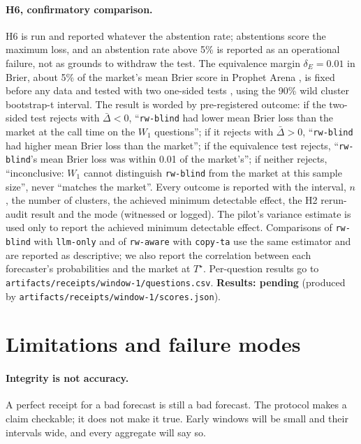 \documentclass[11pt]{article}
\newcommand{\Ts}{T^{\star}}
\newcommand{\pending}[1]{\textbf{Results: pending} (produced by \nolinkurl{#1}).}
\begin{document}
\paragraph{H6, confirmatory comparison.} H6 is run and reported whatever the abstention rate; abstentions score the maximum loss, and an abstention rate above 5\% is reported as an operational failure, not as grounds to withdraw the test. The equivalence margin $\delta_E = 0.01$ in Brier, about 5\% of the market's mean Brier score in Prophet Arena \citep{yang2025prophet}, is fixed before any data and tested with two one-sided tests \citep{schuirmann1987}, using the 90\% wild cluster bootstrap-t interval. The result is worded by pre-registered outcome: if the two-sided test rejects with $\bar\Delta < 0$, ``\texttt{rw-blind} had lower mean Brier loss than the market at the call time on the $W_1$ questions''; if it rejects with $\bar\Delta > 0$, ``\texttt{rw-blind} had higher mean Brier loss than the market''; if the equivalence test rejects, ``\texttt{rw-blind}'s mean Brier loss was within 0.01 of the market's''; if neither rejects, ``inconclusive: $W_1$ cannot distinguish \texttt{rw-blind} from the market at this sample size'', never ``matches the market''. Every outcome is reported with the interval, $n$, the number of clusters, the achieved minimum detectable effect, the H2 rerun-audit result and the mode (witnessed or logged). The pilot's variance estimate is used only to report the achieved minimum detectable effect. Comparisons of \texttt{rw-blind} with \texttt{llm-only} and of \texttt{rw-aware} with \texttt{copy-ta} use the same estimator and are reported as descriptive; we also report the correlation between each forecaster's probabilities and the market at $\Ts$. Per-question results go to \nolinkurl{artifacts/receipts/window-1/questions.csv}. \pending{artifacts/receipts/window-1/scores.json}

\section{Limitations and failure modes}
\label{sec:limits}

\paragraph{Integrity is not accuracy.} A perfect receipt for a bad forecast is still a bad forecast. The protocol makes a claim checkable; it does not make it true. Early windows will be small and their intervals wide, and every aggregate will say so.
\end{document}
